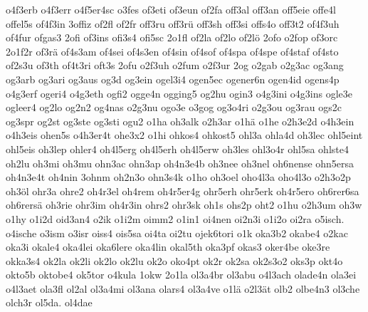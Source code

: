 {    o4f3erb
    o4f3err
    o4f5er4sc
    o3fes
    of3eti
    of3eun
    of2fa
    off3al
    off3an
    off5eie
    offe4l
    offel5s
    of4f3in
    3offiz
    of2fl
    of2fr
    off3ru
    off3rü
    off3sh
    off3si
    offs4o
    off3t2
    of4f3uh
    of4fur
    ofgas3
    2ofi
    of3ins
    ofi3s4
    ofi5sc
    2o1fl
    of2la
    of2lo
    of2lö
    2ofo
    o2fop
    of3orc
    2o1f2r
    of3rä
    of4s3am
    of4sei
    of4s3en
    of4sin
    of4sof
    of4spa
    of4spe
    of4staf
    of4sto
    of2s3u
    of3th
    of4t3ri
    oft3s
    2ofu
    o2f3uh
    o2fum
    o2f3ur
    2og
    o2gab
    o2g3ac
    og3ang
    og3arb
    og3ari
    og3aus
    og3d
    og3ein
    ogel3i4
    ogen5ec
    ogener6n
    ogen4id
    ogens4p
    o4g3erf
    ogeri4
    o4g3eth
    ogfi2
    ogge4n
    ogging5
    og2hu
    ogin3
    o4g3ini
    o4g3ins
    ogle3e
    ogleer4
    og2lo
    og2n2
    og4nas
    o2g3nu
    ogo3e
    o3gog
    og3o4ri
    o2g3ou
    og3rau
    ogs2c
    og3spr
    og2st
    og3ste
    og3sti
    ogu2
    o1ha
    oh3alk
    o2h3ar
    o1hä
    o1he
    o2h3e2d
    o4h3ein
    o4h3eis
    ohen5s
    o4h3er4t
    ohe3x2
    o1hi
    ohkos4
    ohkost5
    ohl3a
    ohla4d
    oh3lec
    ohl5eint
    ohl5eis
    oh3lep
    ohler4
    oh4l5erg
    oh4l5erh
    oh4l5erw
    oh3les
    ohl3o4r
    ohl5sa
    ohlste4
    oh2lu
    oh3mi
    oh3mu
    ohn3ac
    ohn3ap
    oh4n3e4b
    oh3nee
    oh3nel
    oh6nense
    ohn5ersa
    oh4n3e4t
    oh4nin
    3ohnm
    oh2n3o
    ohn3s4k
    o1ho
    oh3oel
    oho4l3a
    oho4l3o
    o2h3o2p
    oh3öl
    ohr3a
    ohre2
    oh4r3el
    oh4rem
    oh4r5er4g
    ohr5erh
    ohr5erk
    oh4r5ero
    oh6rer6sa
    oh6rersä
    oh3rie
    ohr3im
    oh4r3in
    ohrs2
    ohr3sk
    oh1s
    ohs2p
    oht2
    o1hu
    o2h3um
    oh3w
    o1hy
    o1i2d
    oid3an4
    o2ik
    o1i2m
    oimm2
    o1in1
    oi4nen
    oi2n3i
    o1i2o
    oi2ra
    o5isch.
    o4ische
    o3ism
    o3isr
    oiss4
    ois5sa
    oi4ta
    oi2tu
    ojek6tori
    o1k
    oka3b2
    okabe4
    o2kac
    oka3i
    okale4
    oka4lei
    oka6lere
    oka4lin
    okal5th
    oka3pf
    okas3
    oker4be
    oke3re
    okka3s4
    ok2la
    ok2li
    ok2lo
    ok2lu
    ok2o
    oko4pt
    ok2r
    ok2sa
    ok2s3o2
    oks3p
    okt4o
    okto5b
    oktobe4
    ok5tor
    o4kula
    1okw
    2o1la
    ol3a4br
    ol3abu
    o4l3ach
    olade4n
    ola3ei
    o4l3aet
    ola3fl
    ol2al
    ol3a4mi
    ol3ana
    olars4
    ol3a4ve
    o1lä
    o2l3ät
    olb2
    olbe4n3
    ol3che
    olch3r
    ol5da.
    ol4dae
}
